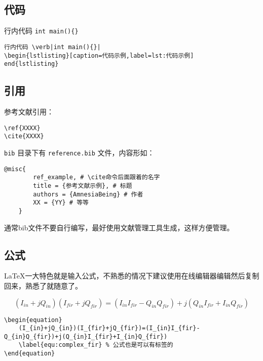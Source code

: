 \subsection{代码}

行内代码 \verb|int main(){}|

\begin{lstlisting}[caption=代码示例,label=lst:代码示例]
行内代码 \verb|int main(){}|
\begin{lstlisting}[caption=代码示例,label=lst:代码示例]
end{lstlisting}
\end{lstlisting}

\subsection{引用}

参考文献引用：\cite{ref_example}

\begin{lstlisting}[caption=引用代码示例,label=lst:引用代码示例]
\ref{XXXX}
\cite{XXXX}
\end{lstlisting}

\verb|bib| 目录下有 \verb|reference.bib| 文件，内容形如：

\begin{lstlisting}[caption=引用代码示例,label=lst:引用代码示例]
    @misc{
        ref_example, # \cite命令后面跟着的名字
        title = {参考文献示例}, # 标题 
        authors = {AmnesiaBeing} # 作者
        XX = {YY} # 等等
    }
\end{lstlisting}

通常bib文件不要自行编写，最好使用文献管理工具生成，这样方便管理。

\subsection{公式}

LaTeX一大特色就是输入公式，不熟悉的情况下建议使用在线编辑器编辑然后复制回来，熟悉了就随意了。

\begin{equation}
    (I_{in}+jQ_{in})(I_{fir}+jQ_{fir})=(I_{in}I_{fir}-Q_{in}Q_{fir})+j(Q_{in}I_{fir}+I_{in}Q_{fir})
    \label{equ:complex_fir}
\end{equation}

\begin{lstlisting}[caption=引用代码示例,label=lst:引用代码示例]
\begin{equation}
    (I_{in}+jQ_{in})(I_{fir}+jQ_{fir})=(I_{in}I_{fir}-Q_{in}Q_{fir})+j(Q_{in}I_{fir}+I_{in}Q_{fir})
    \label{equ:complex_fir} % 公式也是可以有标签的
\end{equation}
\end{lstlisting}
